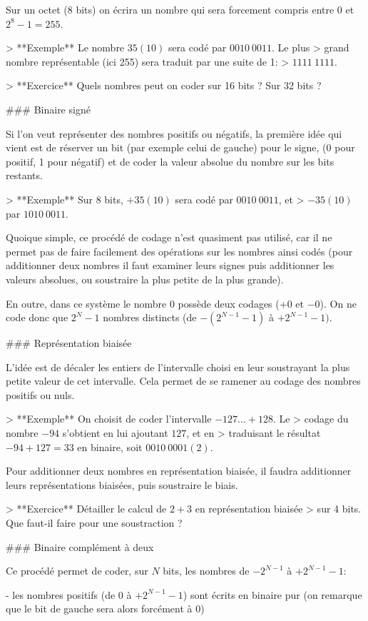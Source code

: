 Sur un octet (8 bits) on écrira un nombre qui sera forcement compris
entre 0 et $2^8-1 =  255$.

> **Exemple** Le nombre $35 (10)$ sera codé par $0010\ 0011$. Le plus
> grand nombre représentable (ici 255) sera traduit par une suite de 1:
> $1111\ 1111$.

> **Exercice** Quels nombres peut on coder sur 16 bits ? Sur 32 bits ?

### Binaire signé

Si l'on veut représenter des nombres positifs ou négatifs, la première
idée qui vient est de réserver un bit (par exemple celui de gauche) pour
le signe, (0 pour positif, 1 pour négatif) et de coder la valeur absolue
du nombre sur les bits restants.

> **Exemple** Sur 8 bits, $+35 (10)$ sera codé par $0010\ 0011$, et
> $-35 (10)$ par $1010\ 0011$.

Quoique simple, ce procédé de codage n'est quasiment pas utilisé, car il
ne permet pas de faire facilement des opérations sur les nombres ainsi
codés (pour additionner deux nombres il faut examiner leurs signes puis
additionner les valeurs absolues, ou soustraire la plus petite de la
plus grande).

En outre, dans ce système le nombre 0 possède deux codages ($+0$ et
$-0$). On ne code donc que $2^N-1$ nombres distincts (de $-(2^{N-1}-1)$
à $+2^{N-1}-1)$.

### Représentation biaisée

L'idée est de décaler les entiers de l'intervalle choisi en leur
soustrayant la plus petite valeur de cet intervalle. Cela permet de se
ramener au codage des nombres positifs ou nuls.

> **Exemple** On choisit de coder l'intervalle $-127\ldots+128$. Le
> codage du nombre $-94$ s'obtient en lui ajoutant $127$, et en
> traduisant le résultat $-94+127=33$ en binaire, soit $0010\ 0001 (2)$.

Pour additionner deux nombres en représentation biaisée, il faudra
additionner leurs représentations biaisées, puis soustraire le biais.

> **Exercice** Détailler le calcul de $2+3$ en représentation biaisée
> sur 4 bits. Que faut-il faire pour une soustraction ?

### Binaire complément à deux

Ce procédé permet de coder, sur $N$ bits, les nombres de $-2^{N-1}$ à
$+2^{N-1}-1$:

-   les nombres positifs (de 0 à $+2^{N-1}-1$) sont écrits en binaire
    pur (on remarque que le bit de gauche sera alors forcément à 0)

